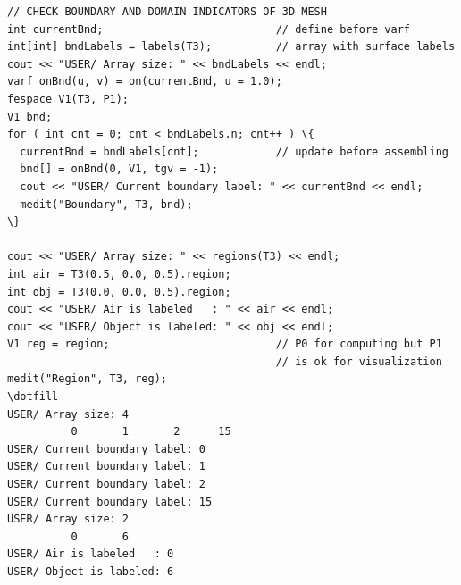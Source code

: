 \documentclass[9pt]{amsart}
\theoremstyle{remark}
\theoremstyle{definition}
\begin{document}
\begin{Verbatim}[commandchars=\\\{\}]
// CHECK BOUNDARY AND DOMAIN INDICATORS OF 3D MESH
int currentBnd;                           // define before varf
int[int] bndLabels = labels(T3);          // array with surface labels
cout << "USER/ Array size: " << bndLabels << endl;
varf onBnd(u, v) = on(currentBnd, u = 1.0);
fespace V1(T3, P1);
V1 bnd;
for ( int cnt = 0; cnt < bndLabels.n; cnt++ ) \{
  currentBnd = bndLabels[cnt];            // update before assembling
  bnd[] = onBnd(0, V1, tgv = -1);
  cout << "USER/ Current boundary label: " << currentBnd << endl;
  medit("Boundary", T3, bnd);
\}

cout << "USER/ Array size: " << regions(T3) << endl;
int air = T3(0.5, 0.0, 0.5).region;
int obj = T3(0.0, 0.0, 0.5).region;
cout << "USER/ Air is labeled   : " << air << endl;
cout << "USER/ Object is labeled: " << obj << endl;
V1 reg = region;                          // P0 for computing but P1
                                          // is ok for visualization
medit("Region", T3, reg);
\dotfill
USER/ Array size: 4
          0       1       2      15
USER/ Current boundary label: 0
USER/ Current boundary label: 1
USER/ Current boundary label: 2
USER/ Current boundary label: 15
USER/ Array size: 2
          0       6
USER/ Air is labeled   : 0
USER/ Object is labeled: 6


\end{Verbatim}
\end{document}
